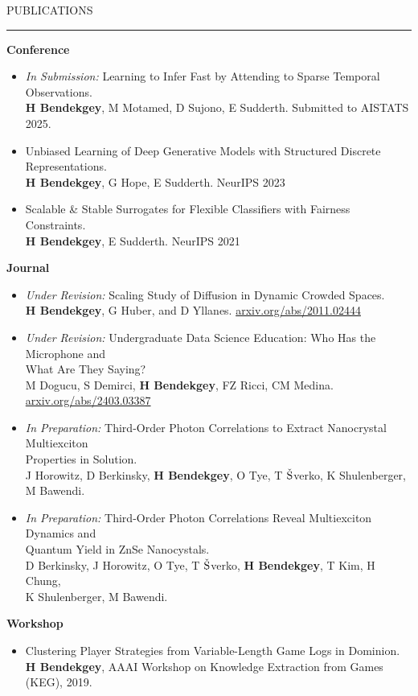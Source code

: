 \documentclass{resume} %
\renewenvironment{rSection}[1]{
\sectionskip
\textcolor{CarnegieMellonRed}{\MakeUppercase{#1}}
\sectionlineskip
\hrule
\begin{list}{}{
\setlength{\leftmargin}{1.5em}
}
\item[]
}{
\end{list}
}
\begin{document}
\newpage
\begin{rSection}{Publications} \itemsep -2pt
{\bf Conference}
\begin{itemize}
	\item \emph{In Submission:} Learning to Infer Fast by Attending to Sparse Temporal Observations.\\
        {\bf H Bendekgey}, M Motamed, D Sujono, E Sudderth. Submitted to AISTATS 2025.

	\item Unbiased Learning of Deep Generative Models with Structured Discrete
Representations.\\
		{\bf H Bendekgey}, G Hope, E Sudderth. NeurIPS 2023
	\item Scalable \& Stable Surrogates for Flexible Classifiers with Fairness Constraints.\\
		{\bf H Bendekgey}, E Sudderth. NeurIPS 2021
\end{itemize}
\vspace{1.0em}
{\bf Journal}
\begin{itemize}
	\item \emph{Under Revision:} Scaling Study of Diffusion in Dynamic Crowded Spaces.\\
	      {\bf H Bendekgey}, G Huber, and D Yllanes. \href{https://arxiv.org/abs/2011.02444}{arxiv.org/abs/2011.02444}
	\item \emph{Under Revision:} Undergraduate Data Science Education: Who Has the Microphone and \\ What Are They Saying?\\
		M Dogucu, S Demirci, {\bf H Bendekgey}, FZ Ricci, CM Medina. \href{https://arxiv.org/abs/2403.03387}{arxiv.org/abs/2403.03387}
	\item \emph{In Preparation:} Third-Order Photon Correlations to Extract Nanocrystal Multiexciton \\Properties in Solution.\\
        J Horowitz, D Berkinsky, {\bf H Bendekgey}, O Tye, T $\check{\textnormal{S}}$verko, K Shulenberger, M Bawendi.	
	\item \emph{In Preparation:} Third-Order Photon Correlations Reveal Multiexciton Dynamics and \\Quantum Yield in ZnSe Nanocystals.\\
        D Berkinsky, J Horowitz, O Tye, T $\check{\textnormal{S}}$verko, {\bf H Bendekgey}, T Kim, H Chung, \\K Shulenberger, M Bawendi.	
\end{itemize}
\vspace{1.0em}
{\bf Workshop}
\begin{itemize}
	\item Clustering Player Strategies from Variable-Length Game Logs in { Dominion}.\\
		{\bf H Bendekgey}, AAAI Workshop on Knowledge Extraction from Games (KEG), 2019.
\end{itemize}
\end{rSection}
\end{document}
